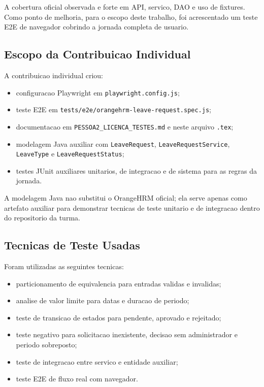 A cobertura oficial observada e forte em API, servico, DAO e uso de fixtures. Como ponto de melhoria, para o escopo deste trabalho, foi acrescentado um teste E2E de navegador cobrindo a jornada completa de usuario.

\subsection{Escopo da Contribuicao Individual}
A contribuicao individual criou:

\begin{itemize}
    \item configuracao Playwright em \texttt{playwright.config.js};
    \item teste E2E em \texttt{tests/e2e/orangehrm-leave-request.spec.js};
    \item documentacao em \texttt{PESSOA2\_LICENCA\_TESTES.md} e neste arquivo \texttt{.tex};
    \item modelagem Java auxiliar com \texttt{LeaveRequest}, \texttt{LeaveRequestService}, \texttt{LeaveType} e \texttt{LeaveRequestStatus};
    \item testes JUnit auxiliares unitarios, de integracao e de sistema para as regras da jornada.
\end{itemize}

A modelagem Java nao substitui o OrangeHRM oficial; ela serve apenas como artefato auxiliar para demonstrar tecnicas de teste unitario e de integracao dentro do repositorio da turma.

\subsection{Tecnicas de Teste Usadas}
Foram utilizadas as seguintes tecnicas:

\begin{itemize}
    \item particionamento de equivalencia para entradas validas e invalidas;
    \item analise de valor limite para datas e duracao de periodo;
    \item teste de transicao de estados para pendente, aprovado e rejeitado;
    \item teste negativo para solicitacao inexistente, decisao sem administrador e periodo sobreposto;
    \item teste de integracao entre servico e entidade auxiliar;
    \item teste E2E de fluxo real com navegador.
\end{itemize}


